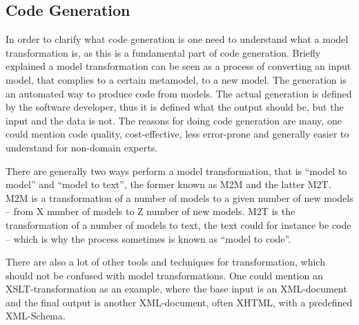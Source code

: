 \subsection{Code Generation}
\label{background-codegeneration}

In order to clarify what code generation is one need to understand what a model
transformation is, as this is a fundamental part of code generation. Briefly explained a model transformation can be seen as a process of converting an input model, that complies to a certain metamodel, to a new model. The generation is an automated way to produce code from models. The actual generation is defined by the software developer, thus it is defined what the output should be, but the input and the data is not. The reasons for doing code generation are many, one could mention code quality, cost-effective, less error-prone and generally easier to understand for non-domain experts.

There are generally two ways perform a model transformation, that is ``model to model'' and ``model to text'', the former known as M2M and the latter M2T. M2M is a transformation of a number of models to a given number of new models -- from X number of models to Z number of new models. M2T is  the transformation of a number of models to text, the text could for instance be code -- which is why the process sometimes is known as ``model to code''.

There are also a lot of other tools and techniques for transformation, which should not be confused with model transformations. One could mention an XSLT-transformation as an example, where the base input is an XML-document and the final output is
another XML-document, often XHTML, with a predefined XML-Schema.
